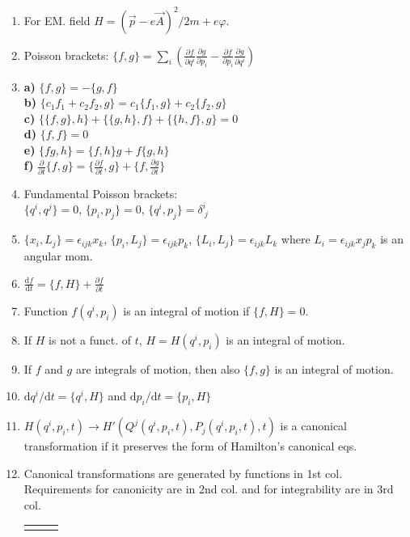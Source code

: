 \documentclass{article}
\renewcommand\d{\mathrm d}
\begin{document}
\begin{multicols}{3}
\begin{enumerate}
            \item For EM. field $H=(\vec p-e\vec A)^2/2m+e\varphi$.
            \item Poisson brackets: $\{f,g\}=\sum_i\left(\frac{\partial f}{\partial q^i}\frac{\partial g}{\partial p_i}-\frac{\partial f}{\partial p_i}\frac{\partial g}{\partial q^i}\right)$
            \item \textbf{a)} $\{f,g\}=-\{g,f\}$\\
                \textbf{b)} $\{c_1f_1+c_2f_2,g\}=c_1\{f_1,g\}+c_2\{f_2,g\}$\\
                \textbf{c)} $\{\{f,g\},h\}+\{\{g,h\},f\}+\{\{h,f\},g\}=0$\\
                \textbf{d)} $\{f,f\}=0$\\
                \textbf{e)} $\{fg,h\}=\{f,h\}g+f\{g,h\}$\\
                \textbf{f)} $\frac{\partial}{\partial t}\{f,g\}=\{\frac{\partial f}{\partial t},g\}+\{f,\frac{\partial g}{\partial t}\}$\\
            \item Fundamental Poisson brackets:\\$\{q^i,q^j\}=0$, $\{p_i,p_j\}=0$, $\{q^i,p_j\}=\delta^i_{~j}$
            \item $\{x_i,L_j\}=\epsilon_{ijk}x_k$, $\{p_i,L_j\}=\epsilon_{ijk}p_k$, $\{L_i,L_j\}=\epsilon_{ijk}L_k$ where $L_i=\epsilon_{ijk}x_jp_k$ is an angular mom.
            \item $\frac{\d f}{\d t}=\{f,H\}+\frac{\partial f}{\partial t}$
            \item Function $f(q^i,p_i)$ is an integral of motion if $\{f,H\}=0$.
            \item If $H$ is not a funct. of $t$, $H=H(q^i,p_i)$ is an integral of motion.
            \item If $f$ and $g$ are integrals of motion, then also $\{f,g\}$ is an integral of motion.
            \item $\d q^i/\d t=\{q^i,H\}$ and $\d p_i/\d t=\{p_i,H\}$
            \item $H(q^i,p_i,t)\to H'(Q^j(q^i,p_i,t),P_j(q^i,p_i,t),t)$ is a canonical transformation if it preserves the form of Hamilton's canonical eqs.
            \item Canonical transformations are generated by functions in 1st col. Requirements for canonicity are in 2nd col. and for integrability are in 3rd col.
            \begin{tabular}{|c|c|c|}
                \hline
                \rule{0pt}{3ex}

\end{tabular}
\end{enumerate}
\end{multicols}
\end{document}
